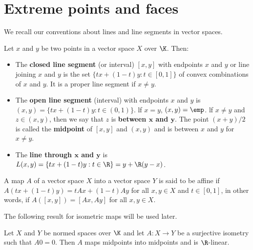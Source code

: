 \section{Extreme points and faces}
We recall our conventions about lines and line segments in vector spaces.
\begin{definition}
Let $x$ and $y$ be two points in a vector space $X$ over $\K$. Then:
\begin{itemize}
\item The \textbf{closed line segment} (or interval) $[x,y]$ with endpoints $x$ and $y$ or line joining $x$ and $y$ is the set $\{tx+(1-t)y:t\in[0,1]\}$ of convex combinations of $x$ and $y$. It is a proper line segment if $x\neq y$.
\item The \textbf{open line segment} (interval) with endpoints $x$ and $y$ is $(x,y)=\{tx+(1-t)y:t\in(0,1)\}$. lf $x=y$, $(x,y)=\emp$. lf $x\neq y$ and $z\in (x,y)$, then we say that $z$ is \textbf{between $\bm{x}$ and $\bm{y}$}. The point $(x+y)/2$ is called the \textbf{midpoint} of $[x,y]$ and $(x,y)$ and is between $x$ and $y$ for $x\neq y$.
\item The \textbf{line through $\bm{x}$ and $\bm{y}$} is $L(x,y)=\{tx+(1-t)y:t\in\R\}=y+\R(y-x)$.
\end{itemize}
\end{definition}
\begin{definition}
A map $A$ of a vector space $X$ into a vector space $Y$ is said to be affine if $A(tx+(1-t)y)=tAx+(1-t)Ay$ for all $x,y\in X$ and $t\in[0,1]$, in other words, if $A([x,y])=[Ax,Ay]$ for all $x,y\in X$.
\end{definition}
The following result for isometric maps will be used later.
\begin{proposition}
Let $X$ and $Y$ be normed spaces over $\K$ and let $A:X\to Y$ be a surjective isometry such that $A0=0$. Then $A$ maps midpoints into midpoints and is $\R$-linear.
\end{proposition}
